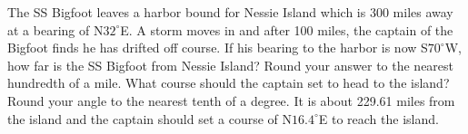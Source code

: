 { The SS Bigfoot leaves a harbor bound for Nessie Island which is 300 miles away at a bearing of N$32^{\circ}$E.  A storm moves in and after 100 miles, the captain of the Bigfoot finds he has drifted off course.  If his bearing to the harbor is now S$70^{\circ}$W, how far is the SS Bigfoot from Nessie Island?  Round your answer to the nearest hundredth of a mile.  What course should the captain set to head to the island?  Round your angle to the nearest tenth of a degree.}
{ It is about 229.61 miles from the island and the captain should set a course of N$16.4^{\circ}$E to reach the island.}

